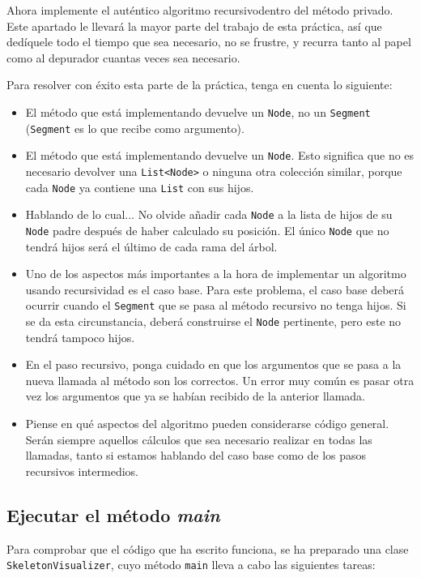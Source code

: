 \documentclass[10pt,a4paper,spanish]{article}
\newcommand{\code}[1]{\texttt{#1}}
\begin{document}
Ahora implemente el auténtico algoritmo recursivodentro del método privado. Este apartado le llevará la mayor parte del trabajo de esta práctica, así que dedíquele todo el tiempo que sea necesario, no se frustre, y recurra tanto al papel como al depurador cuantas veces sea necesario.

Para resolver con éxito esta parte de la práctica, tenga en cuenta lo siguiente:

\begin{itemize}
    \item El método que está implementando devuelve un \code{Node}, no un \code{Segment} (\code{Segment} es lo que recibe como argumento).
    \item El método que está implementando devuelve un \code{Node}. Esto significa que no es necesario devolver una \code{List<Node>} o ninguna otra colección similar, porque cada \code{Node} ya contiene una \code{List} con sus hijos.
    \item Hablando de lo cual... No olvide añadir cada \code{Node} a la lista de hijos de su \code{Node} padre después de haber calculado su posición. El único \code{Node} que no tendrá hijos será el último de cada rama del árbol.
    \item Uno de los aspectos más importantes a la hora de implementar un algoritmo usando recursividad es el caso base. Para este problema, el caso base deberá ocurrir cuando el \code{Segment} que se pasa al método recursivo no tenga hijos. Si se da esta circunstancia, deberá construirse el \code{Node} pertinente, pero este no tendrá tampoco hijos.
    \item En el paso recursivo, ponga cuidado en que los argumentos que se pasa a la nueva llamada al método son los correctos. Un error muy común es pasar otra vez los argumentos que ya se habían recibido de la anterior llamada.
    \item Piense en qué aspectos del algoritmo pueden considerarse código general. Serán siempre aquellos cálculos que sea necesario realizar en todas las llamadas, tanto si estamos hablando del caso base como de los pasos recursivos intermedios.
\end{itemize}

\subsection{Ejecutar el método \textit{main}}

Para comprobar que el código que ha escrito funciona, se ha preparado una clase \code{SkeletonVisualizer}, cuyo método \code{main} lleva a cabo las siguientes tareas:
\end{document}
